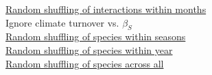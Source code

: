 \documentclass[11pt]{article}
\begin{document}
\underline{Random shuffling of interactions within months} \\
Ignore climate turnover vs. $\beta_{S}$ \\

\underline{Random shuffling of species within seasons} \\
\underline{Random shuffling of species within year} \\
\underline{Random shuffling of species across all} \\


\newpage


\end{document}
